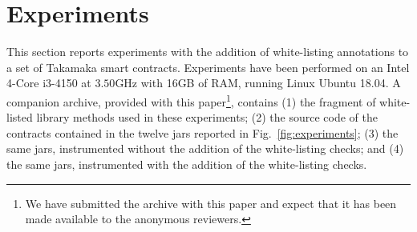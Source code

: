 \section{Experiments}\label{sec:experiments}

This section reports experiments with the addition of white-listing annotations
to a set of Takamaka smart contracts. Experiments have been performed on
an Intel 4-Core i3-4150 at $3.50$GHz with 16GB of RAM, running Linux Ubuntu 18.04.
A companion archive, provided with this paper\footnote{We have submitted the archive
with this paper and expect that it has been made available to the anonymous reviewers.},
contains (1) the fragment of white-listed library methods
used in these experiments; (2) the source code of the contracts
contained in the twelve jars reported in Fig.~\ref{fig:experiments};
(3) the same jars, instrumented without the addition of the white-listing
checks; and (4) the same jars, instrumented with the addition of the white-listing checks.

